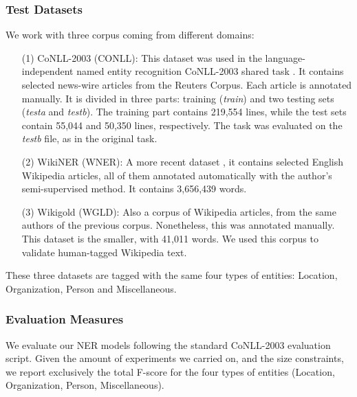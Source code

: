 \documentclass{llncs}
\begin{document}
\subsubsection{Test Datasets}We work with three corpus coming from different domains:
\begin{itemize}
\item [(1)] CoNLL-2003 (CONLL): This dataset was used in the language-independent named entity recognition CoNLL-2003 shared task \cite{SangM03}. It contains selected news-wire articles from the Reuters Corpus. Each article is annotated manually. It is divided in three parts:  training (\textit{train}) and two testing sets (\textit{testa} and \textit{testb}). The training part contains 219,554 lines, while the test sets contain 55,044 and 50,350 lines, respectively. The task was evaluated on the \textit{testb} file, as in the original task.
\item [(2)]WikiNER (WNER): A more recent dataset \cite{Balasuriya2009}, it contains selected English Wikipedia articles, all of them annotated automatically with the author's semi-supervised method. It contains 3,656,439 words. 
\item[(3)] Wikigold (WGLD): Also a corpus of Wikipedia articles, from the same authors of the previous corpus. Nonetheless, this was annotated manually. This dataset is the smaller, with 41,011 words. We used this corpus to validate human-tagged Wikipedia text. 


\end{itemize}
These three datasets are tagged with the same four types of entities: Location, Organization, Person and Miscellaneous.
\subsubsection{Evaluation Measures}
We evaluate our NER models following the standard CoNLL-2003 evaluation script. Given the amount of experiments we carried on, and the size constraints, we report exclusively the total F-score for the four types of entities (Location, Organization, Person, Miscellaneous).
\end{document}
